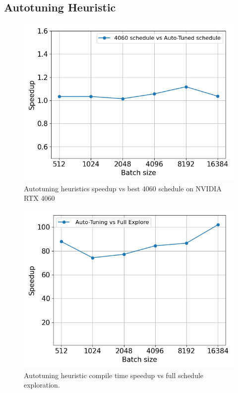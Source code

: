 \subsection{Autotuning Heuristic}
\begin{figure}[htb]
  \centering
  \includegraphics[width=0.75\linewidth]{figures/geomean_speedup_T400_4060_vs_T400.png}
  \caption{Autotuning heuristics speedup vs best 4060 schedule on NVIDIA RTX 4060}
  \label{Fig:AutotuningSpeedupvs4060Sched}
\end{figure}


\begin{figure}[htb]
  \centering
  \includegraphics[width=0.75\linewidth]{figures/geomean_speedup_4060_full_exp_vs_at.png}
  \caption{Autotuning heuristic compile time speedup vs full schedule exploration.}
  \label{Fig:HeuristicVsFullExplore_Speedup}
\end{figure}

